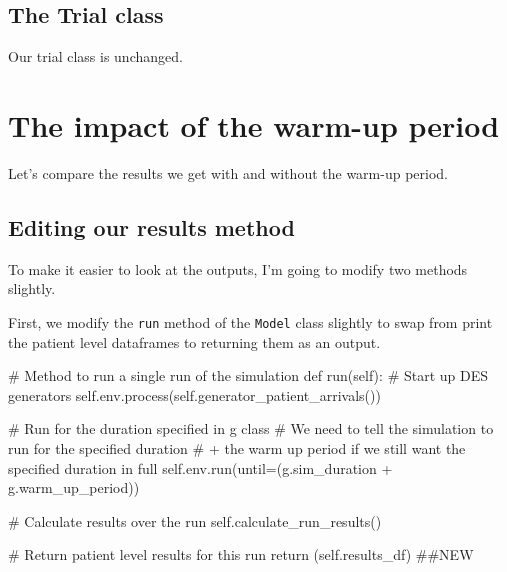 \documentclass[
  letterpaper,
  DIV=11,
  numbers=noendperiod]{scrreprt}
\newenvironment{Shaded}{}{}
\newcommand{\CommentTok}[1]{\textcolor[rgb]{0.42,0.45,0.49}{#1}}
\newcommand{\ControlFlowTok}[1]{\textcolor[rgb]{0.84,0.23,0.29}{#1}}
\newcommand{\KeywordTok}[1]{\textcolor[rgb]{0.84,0.23,0.29}{#1}}
\newcommand{\NormalTok}[1]{\textcolor[rgb]{0.14,0.16,0.18}{#1}}
\newcommand{\OperatorTok}[1]{\textcolor[rgb]{0.14,0.16,0.18}{#1}}
\newcommand{\VariableTok}[1]{\textcolor[rgb]{0.89,0.38,0.04}{#1}}
\begin{document}
\subsection{The Trial class}\label{the-trial-class-2}

Our trial class is unchanged.

\section{The impact of the warm-up
period}\label{the-impact-of-the-warm-up-period}

Let's compare the results we get with and without the warm-up period.

\subsection{Editing our results
method}\label{editing-our-results-method}

To make it easier to look at the outputs, I'm going to modify two
methods slightly.

First, we modify the \texttt{run} method of the \texttt{Model} class
slightly to swap from print the patient level dataframes to returning
them as an output.

\begin{Shaded}
\begin{Highlighting}[]
\CommentTok{\# Method to run a single run of the simulation}
\KeywordTok{def}\NormalTok{ run(}\VariableTok{self}\NormalTok{):}
    \CommentTok{\# Start up DES generators}
    \VariableTok{self}\NormalTok{.env.process(}\VariableTok{self}\NormalTok{.generator\_patient\_arrivals())}

    \CommentTok{\# Run for the duration specified in g class}
    \CommentTok{\# We need to tell the simulation to run for the specified duration}
    \CommentTok{\# + the warm up period if we still want the specified duration in full}
    \VariableTok{self}\NormalTok{.env.run(until}\OperatorTok{=}\NormalTok{(g.sim\_duration }\OperatorTok{+}\NormalTok{ g.warm\_up\_period))}

    \CommentTok{\# Calculate results over the run}
    \VariableTok{self}\NormalTok{.calculate\_run\_results()}

    \CommentTok{\# Return patient level results for this run}
    \ControlFlowTok{return}\NormalTok{ (}\VariableTok{self}\NormalTok{.results\_df) }\CommentTok{\#\#NEW}
\end{Highlighting}
\end{Shaded}
\end{document}
